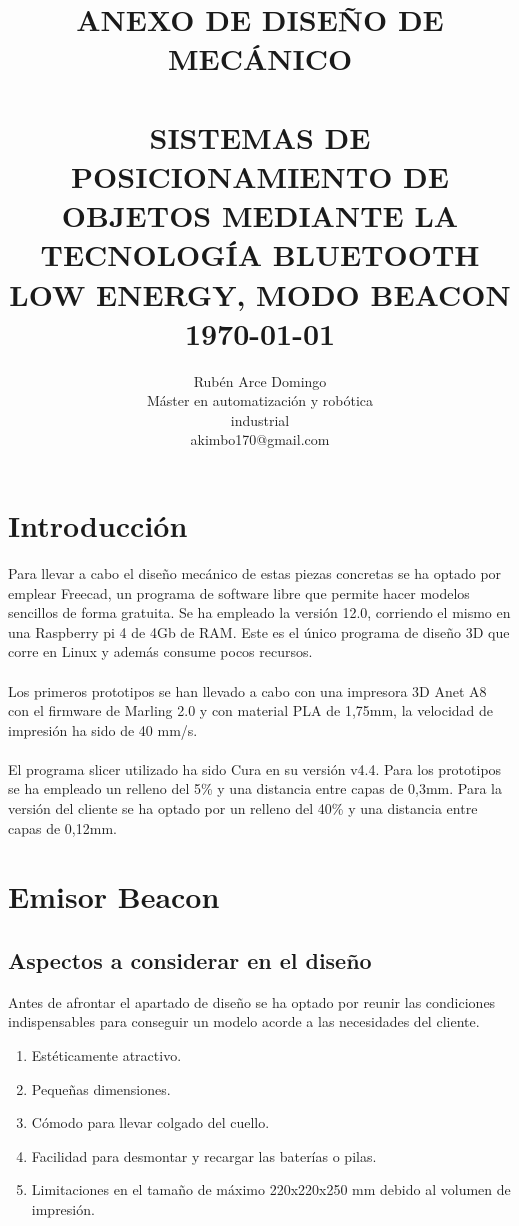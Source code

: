 \documentclass[paper=a4, fontsize=11pt,twoside]{scrartcl}
\title{	\normalsize \textsc{ANEXO DE DISEÑO DE MECÁNICO} 	%
		 	\\[2.0cm]								%
			\HRule{0.5pt} \\						%
			\LARGE \textbf{\uppercase{Sistemas de posicionamiento de objetos mediante la tecnología Bluetooth Low Energy, modo Beacon}}	%
			\HRule{2pt} \\ [0.5cm]		%
			\normalsize \today			%
		}
\author{
		Rubén Arce Domingo\\	
		Máster en automatización y robótica\\	
		industrial\\
		akimbo170@gmail.com\\
}
\makeatletter
\def\printtitle{%
    {\centering \@title\par}}
\def\printauthor{%
    {\centering \large \@author}}
\makeatother
\begin{document}
\thispagestyle{empty}		%
\printtitle					%
  	\vfill
\printauthor				%
\newpage
\cleardoublepage
\tableofcontents
\listoffigures
\cleardoublepage
\pagestyle{fancy}
\section{Introducción}
    Para llevar a cabo el diseño mecánico de estas piezas concretas se ha optado por emplear Freecad, un
    programa de software libre que permite hacer modelos sencillos de forma gratuita.
    Se ha empleado la versión 12.0, corriendo el mismo en una Raspberry pi 4 de 4Gb de RAM. Este es el único
    programa de diseño 3D que corre en Linux y además consume pocos recursos.
    \paragraph{}
    Los primeros prototipos se han llevado a cabo con una impresora 3D Anet A8 con el firmware de Marling
    2.0 y con material PLA de 1,75mm, la velocidad de impresión ha sido de 40 mm/s.
    \paragraph{}
    El programa slicer utilizado ha sido Cura en su versión v4.4. Para los prototipos se ha empleado un relleno del 5\% y una distancia
    entre capas de 0,3mm. Para la versión del cliente se ha optado por un relleno del 40\% y una distancia entre capas de 0,12mm.
\section{Emisor Beacon}
    \subsection{Aspectos a considerar en el diseño}
        Antes de afrontar el apartado de diseño se ha optado por reunir las condiciones indispensables para 
        conseguir un modelo acorde a las necesidades del cliente.
        \begin{enumerate}
            \item Estéticamente atractivo.
            \item Pequeñas dimensiones.
            \item Cómodo para llevar colgado del cuello.
            \item Facilidad para desmontar y recargar las baterías o pilas.
            \item Limitaciones en el tamaño de máximo 220x220x250 mm debido al volumen de impresión.
        \end{enumerate}
\end{document}
